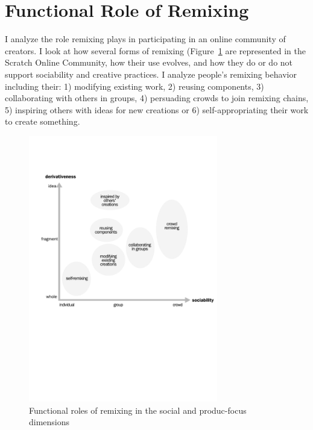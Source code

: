 \section{Functional Role of Remixing}

I analyze the role remixing plays in participating in an online community of creators.
I look at how several forms of remixing (Figure~\ref{fig:function} are represented in the Scratch Online Community, how their use evolves, and how they do or do not support sociability and creative practices.
I analyze people's remixing behavior including their: 
1) modifying existing work, 
2) reusing components, 
3) collaborating with others in groups, 
4) persuading crowds to join remixing chains, 
5) inspiring others with ideas for new creations or 
6) self-appropriating their work to create something. 

\begin{figure}
\centering
\includegraphics[width=3.25in]{figures/function.pdf}
\caption{Functional roles of remixing in the social and produc-focus dimensions}
\label{fig:function}
\end{figure}

